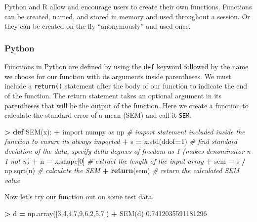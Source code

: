 \documentclass[
]{book}
\newenvironment{Shaded}{\begin{snugshade}}{\end{snugshade}}
\newcommand{\CommentTok}[1]{\textcolor[rgb]{0.56,0.35,0.01}{\textit{#1}}}
\newcommand{\ControlFlowTok}[1]{\textcolor[rgb]{0.13,0.29,0.53}{\textbf{#1}}}
\newcommand{\DecValTok}[1]{\textcolor[rgb]{0.00,0.00,0.81}{#1}}
\newcommand{\FloatTok}[1]{\textcolor[rgb]{0.00,0.00,0.81}{#1}}
\newcommand{\ImportTok}[1]{#1}
\newcommand{\KeywordTok}[1]{\textcolor[rgb]{0.13,0.29,0.53}{\textbf{#1}}}
\newcommand{\NormalTok}[1]{#1}
\newcommand{\OperatorTok}[1]{\textcolor[rgb]{0.81,0.36,0.00}{\textbf{#1}}}
\begin{document}
Python and R allow and encourage users to create their own functions. Functions can be created, named, and stored in memory and used throughout a session. Or they can be created on-the-fly ``anonymously'' and used once.

\hypertarget{python-7}{%
\subsubsection*{Python}\label{python-7}}

Functions in Python are defined by using the \texttt{def} keyword followed by the name we choose for our function with its arguments inside parentheses. We must include a \texttt{return()} statement after the body of our function to indicate the end of the function. The return statement takes an optional argument in its parentheses that will be the output of the function. Here we create a function to calculate the standard error of a mean (SEM) and call it \texttt{SEM}.

\begin{Shaded}
\begin{Highlighting}[]
\OperatorTok{\textgreater{}} \KeywordTok{def}\NormalTok{ SEM(x):}
\OperatorTok{+}   \ImportTok{import}\NormalTok{ numpy }\ImportTok{as}\NormalTok{ np }\CommentTok{\# import statement included inside the function to ensure it\textquotesingle{}s always imported}
\OperatorTok{+}\NormalTok{   s }\OperatorTok{=}\NormalTok{ x.std(ddof}\OperatorTok{=}\DecValTok{1}\NormalTok{) }\CommentTok{\# find standard deviation of the data, specify delta degrees of freedom as 1 (makes denominator n{-}1 not n)}
\OperatorTok{+}\NormalTok{   n }\OperatorTok{=}\NormalTok{ x.shape[}\DecValTok{0}\NormalTok{] }\CommentTok{\# extract the length of the input array}
\OperatorTok{+}\NormalTok{   sem }\OperatorTok{=}\NormalTok{ s }\OperatorTok{/}\NormalTok{ np.sqrt(n) }\CommentTok{\# calculate the SEM}
\OperatorTok{+}   \ControlFlowTok{return}\NormalTok{(sem) }\CommentTok{\# return the calculated SEM value}
\end{Highlighting}
\end{Shaded}

Now let's try our function out on some test data.

\begin{Shaded}
\begin{Highlighting}[]
\OperatorTok{\textgreater{}}\NormalTok{ d }\OperatorTok{=}\NormalTok{ np.array([}\DecValTok{3}\NormalTok{,}\DecValTok{4}\NormalTok{,}\DecValTok{4}\NormalTok{,}\DecValTok{7}\NormalTok{,}\DecValTok{9}\NormalTok{,}\DecValTok{6}\NormalTok{,}\DecValTok{2}\NormalTok{,}\DecValTok{5}\NormalTok{,}\DecValTok{7}\NormalTok{])}
\OperatorTok{+}\NormalTok{ SEM(d)}
\FloatTok{0.7412035591181296}
\end{Highlighting}
\end{Shaded}
\end{document}
